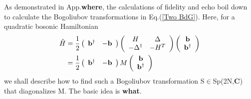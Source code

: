As demonstrated in App.{\bf\color{red}where}, the calculations of fidelity and echo boil down to calculate the Bogoliubov transformations in Eq.(\ref{Two BdG}). Here, for a quadratic bosonic Hamiltonian
\begin{eqnarray}\begin{aligned}
\label{Quadratic boson H2}
\hat{H}&=\frac{1}{2}
\left(\begin{array}{ccc}
{\bf b}^\dagger & -{\bf b}
\end{array}\right)
\left(\begin{array}{ccc}
H & \Delta\\
-\Delta^\dagger & -H^T
\end{array}\right)
\left(\begin{array}{ccc}
{\bf b} \\
{\bf b}^\dagger
\end{array}\right)\\
&=\frac{1}{2}
\left(\begin{array}{ccc}
{\bf b}^\dagger & -{\bf b}
\end{array}\right)
M
\left(\begin{array}{ccc}
{\bf b} \\
{\bf b}^\dagger
\end{array}\right)
\end{aligned}\end{eqnarray}
we shall describe how to find such a Bogoliubov transformation S$\in$Sp(2N,{\bf C}) that diagonalizes M. The basic idea is {\bf\color{red}what}.

